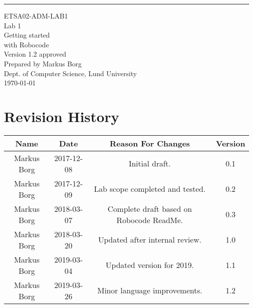 \documentclass{scrreprt}
\date{}
\def\myversion{1.2 }
\begin{document}
\begin{flushright}
    \rule{16cm}{5pt}\vskip1cm
    \begin{bfseries}
    	\LARGE{ETSA02-ADM-LAB1}\\
    	\vspace{1.5cm}
        \Huge{Lab 1}\\
        \vspace{0.5cm}
        Getting started\\
        \vspace{0.5cm}
        with Robocode\\
        \vspace{1.5cm}
        \LARGE{Version \myversion approved}\\
        \vspace{1.5cm}
        Prepared by Markus Borg\\
        Dept. of Computer Science, Lund University\\
        \vspace{1.5cm}
        \today\\
    \end{bfseries}
\end{flushright}


\chapter*{Revision History}

\begin{center}
    \begin{tabular}{|c|c|c|c|}
        \hline
	    Name & Date & Reason For Changes & Version\\
        \hline
	    Markus Borg & 2017-12-08 & Initial draft. & 0.1\\
        \hline
        Markus Borg & 2017-12-09 & Lab scope completed and tested. & 0.2\\
        \hline
        Markus Borg & 2018-03-07 & Complete draft based on Robocode ReadMe. & 0.3\\
        \hline
        Markus Borg & 2018-03-20 & Updated after internal review. & 1.0\\
        \hline
        Markus Borg & 2019-03-04 & Updated version for 2019. & 1.1\\
        \hline
        Markus Borg & 2019-03-26 & Minor language improvements. & 1.2\\
        \hline
    \end{tabular}
\end{center}
\end{document}
